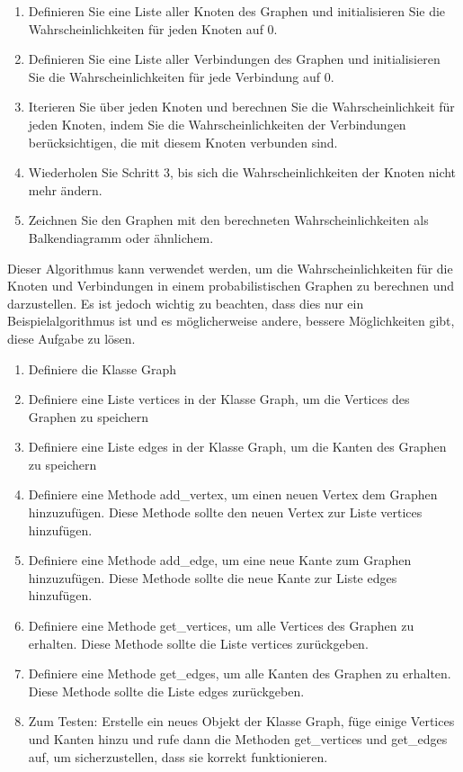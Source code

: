 \begin{enumerate}
	\item Definieren Sie eine Liste aller Knoten des Graphen und initialisieren Sie die Wahrscheinlichkeiten für jeden Knoten auf 0.
	
	\item Definieren Sie eine Liste aller Verbindungen des Graphen und initialisieren Sie die Wahrscheinlichkeiten für jede Verbindung auf 0.
	
	\item Iterieren Sie über jeden Knoten und berechnen Sie die Wahrscheinlichkeit für jeden Knoten, indem Sie die Wahrscheinlichkeiten der Verbindungen berücksichtigen, die mit diesem Knoten verbunden sind.
	
	
	\item Wiederholen Sie Schritt 3, bis sich die Wahrscheinlichkeiten der Knoten nicht mehr ändern.
	
	\item Zeichnen Sie den Graphen mit den berechneten Wahrscheinlichkeiten als Balkendiagramm oder ähnlichem.
	
\end{enumerate}

Dieser Algorithmus kann verwendet werden, um die Wahrscheinlichkeiten für die Knoten und Verbindungen in einem probabilistischen Graphen zu berechnen und darzustellen. Es ist jedoch wichtig zu beachten, dass dies nur ein Beispielalgorithmus ist und es möglicherweise andere, bessere Möglichkeiten gibt, diese Aufgabe zu lösen.


\begin{enumerate}
	\item Definiere die Klasse Graph
	\item Definiere eine Liste vertices in der Klasse Graph, um die Vertices des Graphen zu speichern
	\item Definiere eine Liste edges in der Klasse Graph, um die Kanten des Graphen zu speichern
	\item Definiere eine Methode add\_vertex, um einen neuen Vertex dem Graphen hinzuzufügen. Diese Methode sollte den neuen Vertex zur Liste vertices hinzufügen.
	\item Definiere eine Methode add\_edge, um eine neue Kante zum Graphen hinzuzufügen. Diese Methode sollte die neue Kante zur Liste edges hinzufügen.
	\item Definiere eine Methode get\_vertices, um alle Vertices des Graphen zu erhalten. Diese Methode sollte die Liste vertices zurückgeben.
	\item Definiere eine Methode get\_edges, um alle Kanten des Graphen zu erhalten. Diese Methode sollte die Liste edges zurückgeben.
	\item Zum Testen: Erstelle ein neues Objekt der Klasse Graph, füge einige Vertices und Kanten hinzu und rufe dann die Methoden get\_vertices und get\_edges auf, um sicherzustellen, dass sie korrekt funktionieren.
\end{enumerate}